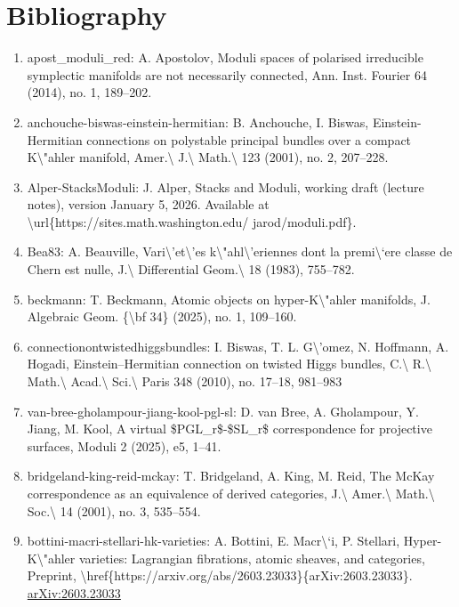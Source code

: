 \documentclass[11pt]{article}
\begin{document}
\section*{Bibliography}
\begin{enumerate}[leftmargin=*]
  \item apost\_moduli\_red: A. Apostolov, Moduli spaces of polarised irreducible symplectic manifolds are not necessarily connected, Ann. Inst. Fourier 64 (2014), no. 1, 189--202.
  \item anchouche-biswas-einstein-hermitian: B. Anchouche, I. Biswas, Einstein-Hermitian connections on polystable principal bundles over a compact K\textbackslash{}"ahler manifold, Amer.\textbackslash{} J.\textbackslash{} Math.\textbackslash{} 123 (2001), no. 2, 207--228.
  \item Alper-StacksModuli: J. Alper, Stacks and Moduli, working draft (lecture notes), version January 5, 2026. Available at \textbackslash{}url\{https://sites.math.washington.edu/ jarod/moduli.pdf\}.
  \item Bea83: A. Beauville, Vari\textbackslash{}'et\textbackslash{}'es k\textbackslash{}"ahl\textbackslash{}'eriennes dont la premi\textbackslash{}`ere classe de Chern est nulle, J.\textbackslash{} Differential Geom.\textbackslash{} 18 (1983), 755--782.
  \item beckmann: T. Beckmann, Atomic objects on hyper-K\textbackslash{}"ahler manifolds, J. Algebraic Geom. \{\textbackslash{}bf 34\} (2025), no. 1, 109--160.
  \item connectionontwistedhiggsbundles: I. Biswas, T. L. G\textbackslash{}'omez, N. Hoffmann, A. Hogadi, Einstein--Hermitian connection on twisted Higgs bundles, C.\textbackslash{} R.\textbackslash{} Math.\textbackslash{} Acad.\textbackslash{} Sci.\textbackslash{} Paris 348 (2010), no. 17--18, 981--983
  \item van-bree-gholampour-jiang-kool-pgl-sl: D. van Bree, A. Gholampour, Y. Jiang, M. Kool, A virtual \$PGL\_r\$-\$SL\_r\$ correspondence for projective surfaces, Moduli 2 (2025), e5, 1--41.
  \item bridgeland-king-reid-mckay: T. Bridgeland, A. King, M. Reid, The McKay correspondence as an equivalence of derived categories, J.\textbackslash{} Amer.\textbackslash{} Math.\textbackslash{} Soc.\textbackslash{} 14 (2001), no. 3, 535--554.
  \item bottini-macri-stellari-hk-varieties: A. Bottini, E. Macr\textbackslash{}`i, P. Stellari, Hyper-K\textbackslash{}"ahler varieties: Lagrangian fibrations, atomic sheaves, and categories, Preprint, \textbackslash{}href\{https://arxiv.org/abs/2603.23033\}\{arXiv:2603.23033\}. \href{https://arxiv.org/abs/2603.23033}{arXiv:2603.23033}

\end{enumerate}
\end{document}
